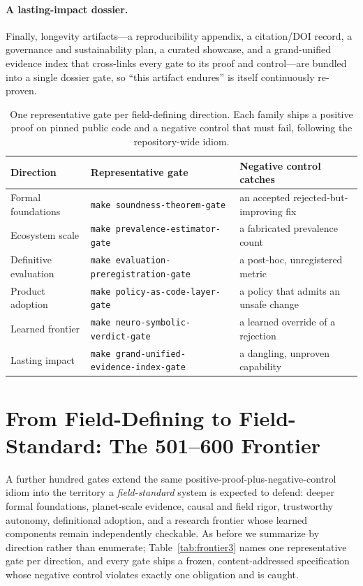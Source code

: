 \documentclass[11pt]{article}
\newcommand{\gate}[1]{\texttt{make #1}}
\begin{document}
\paragraph{A lasting-impact dossier.}
Finally, longevity artifacts---a reproducibility appendix, a citation/DOI record, a governance and
sustainability plan, a curated showcase, and a grand-unified evidence index that cross-links every
gate to its proof and control---are bundled into a single dossier gate, so ``this artifact endures''
is itself continuously re-proven.

\begin{table}[t]
\centering
\small
\begin{tabular}{@{}lll@{}}
\toprule
\textbf{Direction} & \textbf{Representative gate} & \textbf{Negative control catches} \\
\midrule
Formal foundations & \gate{soundness-theorem-gate} & an accepted rejected-but-improving fix \\
Ecosystem scale & \gate{prevalence-estimator-gate} & a fabricated prevalence count \\
Definitive evaluation & \gate{evaluation-preregistration-gate} & a post-hoc, unregistered metric \\
Product adoption & \gate{policy-as-code-layer-gate} & a policy that admits an unsafe change \\
Learned frontier & \gate{neuro-symbolic-verdict-gate} & a learned override of a rejection \\
Lasting impact & \gate{grand-unified-evidence-index-gate} & a dangling, unproven capability \\
\bottomrule
\end{tabular}
\caption{One representative gate per field-defining direction. Each family ships a positive proof on
pinned public code and a negative control that must fail, following the repository-wide idiom.}
\label{tab:frontier2}
\end{table}

\section{From Field-Defining to Field-Standard: The 501--600 Frontier}
\label{sec:frontier3}

A further hundred gates extend the same positive-proof-plus-negative-control idiom into the territory a
\emph{field-standard} system is expected to defend: deeper formal foundations, planet-scale evidence,
causal and field rigor, trustworthy autonomy, definitional adoption, and a research frontier whose
learned components remain independently checkable. As before we summarize by direction rather than
enumerate; Table~\ref{tab:frontier3} names one representative gate per direction, and every gate ships
a frozen, content-addressed specification whose negative control violates exactly one obligation and is
caught.
\end{document}
